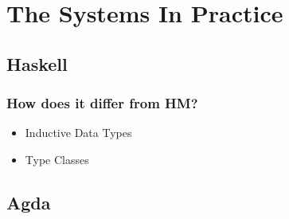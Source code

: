 \chapter{The Systems In Practice}
\section{Haskell}
\subsection{How does it differ from HM?}
\begin{itemize}
\item Inductive Data Types
\item Type Classes
\end{itemize}
\section{Agda}
